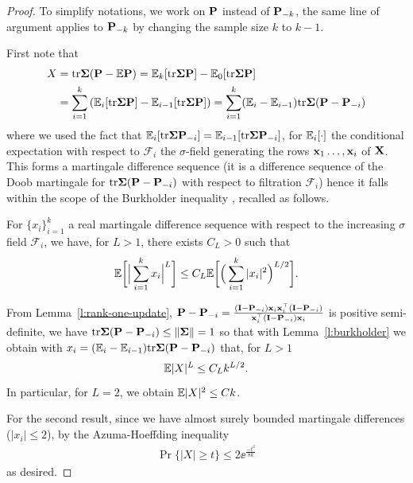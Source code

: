 \documentclass[thesis.tex]{subfiles}
\begin{document}
\begin{proof}
To simplify notations, we work on $\P$ instead of $\P_{-k}$, the same line of argument applies to $\P_{-k}$ by changing the sample size $k$ to $k-1$.

First note that
\begin{align*}
  X
  &= \tr \Sigmab (\P - \E \P)
  = \E_k [\tr \Sigmab \P]  - \E_0[ \tr \Sigmab \P ]\\
  &= \sum_{i=1}^k \left( \E_i[\tr \Sigmab \P] - \E_{i-1}[\tr \Sigmab \P]\right)
  = \sum_{i=1}^k (\E_i - \E_{i-1}) \tr \Sigmab (\P - \P_{-i})
\end{align*}
where we used the fact that $\E_i [\tr \Sigmab \P_{-i}] = \E_{i-1} [\tr \Sigmab \P_{-i}]$, for $\E_i[\cdot]$ the conditional expectation with respect to $\mathcal F_i$ the $\sigma$-field generating the rows $\x_1 \ldots, \x_i$ of $\X$. This forms a martingale difference sequence (it is a difference sequence of
the Doob martingale for $\tr \Sigmab (\P - \P_{-i})$ with respect to filtration $\mathcal{F}_i$)
hence it falls within the scope of the Burkholder inequality \cite{burkholder1973distribution}, recalled as follows.

\begin{lemma}\label{l:burkholder}
For $\{ x_i \}_{i=1}^k$ a real martingale difference sequence with respect to the increasing $\sigma$ field $\mathcal F_i$, we have, for $L > 1$, there exists $C_L > 0$ such that
\[
  \E \bigg[
    \Big| \sum_{i=1}^k x_i \Big|^L
  \bigg]
  \le C_L \E \bigg[
    \Big( \sum_{i=1}^k |x_i|^2 \Big)^{L/2}
  \bigg].
\]
\end{lemma}

From Lemma~\ref{l:rank-one-update}, $\P - \P_{-i} = \frac{(\I - \P_{-i}) \x_i \x_i^\top (\I - \P_{-i}) }{ \x_i^\top (\I - \P_{-i}) \x_i}$ is positive semi-definite, we have $\tr \Sigmab (\P - \P_{-i}) \le \| \Sigmab \| = 1$ so that with Lemma~\ref{l:burkholder} we obtain with $x_i = (\E_i - \E_{i-1}) \tr \Sigmab (\P - \P_{-i})$ that, for $L > 1$
\[
  \E |X|^L \le C_L k^{L/2}.
\]
In particular, for $L=2$, we obtain $\E |X|^2 \le C k$.

For the second result, since we have almost surely bounded martingale differences
($\lvert x_i \rvert \leq 2$), by the Azuma-Hoeffding inequality
\begin{align*}
  \Pr\{
    \lvert X \rvert
    \geq t
  \}
  \leq 2 \ee^{\frac{-t^2}{8 k}}
\end{align*}
as desired.
\end{proof}
\end{document}
